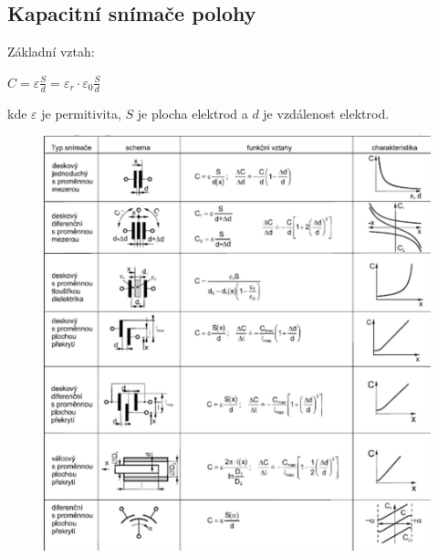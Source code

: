 \subsection{Kapacitní snímače polohy}
Základní vztah:
\begin{center}
    \(C = \varepsilon \frac{S}{d} = \varepsilon_r \cdot \varepsilon_0 \frac{S}{d}\)
\end{center}
kde \(\varepsilon\) je permitivita, \(S\) je plocha elektrod a \(d\) je vzdálenost elektrod.\\
\begin{figure}[h!]
    \centering
    \includegraphics[scale = 0.1]{img/KapTypy.png}
\end{figure}

